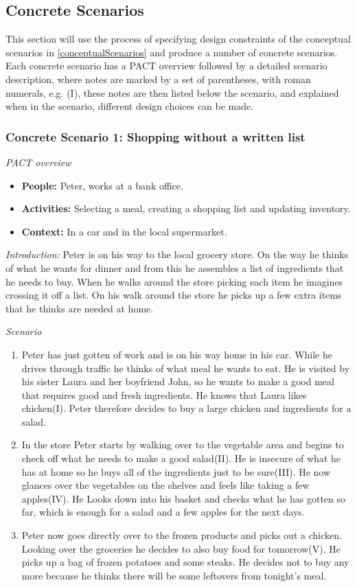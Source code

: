 \subsection{Concrete Scenarios}\label{ConcreteScenarios}
This section will use the process of specifying design constraints of the conceptual scenarios in \cref{conceptualScenarios} and produce a number of concrete scenarios. Each concrete scenario has a PACT overview followed by a detailed scenario description, where notes are marked by a set of parentheses, with roman numerals, e.g. (I), these notes are then listed below the scenario, and explained when in the scenario, different design choices can be made.

\subsubsection{Concrete Scenario 1: Shopping without a written list}\label{ConcreteScenario1}

\emph{PACT overview}
\begin{itemize}
\item \textbf{People:} Peter, works at a bank office.
\item \textbf{Activities:} Selecting a meal, creating a shopping list and updating inventory.  
\item \textbf{Context:} In a car and in the local supermarket.
\end{itemize}

\emph{Introduction:} Peter is on his way to the local grocery store. On the way he thinks of what he wants for dinner and from this he assembles a list of ingredients that he needs to buy. When he walks around the store picking each item he imagines crossing it off a list. On his walk around the store he picks up a few extra items that he thinks are needed at home.

\emph{Scenario}
\begin{enumerate}
\item Peter has just gotten of work and is on his way home in his car. While he drives through traffic he thinks of what meal he wants to eat. He is visited by his sister Laura and her boyfriend John, so he wants to make a good meal that requires good and fresh ingredients. He knows that Laura likes chicken(I). Peter therefore decides to buy a large chicken and ingredients for a salad. 
\item In the store Peter starts by walking over to the vegetable area and begins to check off what he needs to make a good salad(II). He is insecure of what he has at home so he buys all of the ingredients just to be sure(III). He now glances over the vegetables on the shelves and feels like taking a few apples(IV). He Looks down into his basket and checks what he has gotten so far, which is enough for a salad and a few apples for the next days.
\item Peter now goes directly over to the frozen products and picks out a chicken. Looking over the groceries he decides to also buy food for tomorrow(V). He picks up a bag of frozen potatoes and some steaks. He decides not to buy any more because he thinks there will be some leftovers from tonight's meal.  
\end{enumerate}

